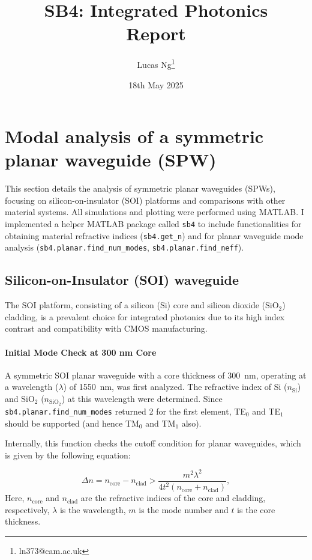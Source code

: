 \documentclass[10pt, a4paper]{article}
\title{\Large \bfseries SB4: Integrated Photonics\\[0.5em] \large Report}
\author{Lucas Ng\thanks{ln373@cam.ac.uk}}
\date{18th May 2025}
\begin{document}
\maketitle

\section{Modal analysis of a symmetric planar waveguide (SPW)}
This section details the analysis of symmetric planar waveguides (SPWs), focusing on silicon-on-insulator (SOI) platforms and comparisons with other material systems. All simulations and plotting were performed using MATLAB. I implemented a helper MATLAB package called \texttt{sb4} to include functionalities for obtaining material refractive indices (\texttt{sb4.get\_n}) and for planar waveguide mode analysis (\texttt{sb4.planar.find\_num\_modes}, \texttt{sb4.planar.find\_neff}).

\subsection{Silicon-on-Insulator (SOI) waveguide}
The SOI platform, consisting of a silicon (Si) core and silicon dioxide (SiO$_2$) cladding, is a prevalent choice for integrated photonics due to its high index contrast and compatibility with CMOS manufacturing.

\paragraph{Initial Mode Check at 300 nm Core}
A symmetric SOI planar waveguide with a core thickness of 300~nm, operating at a wavelength ($\lambda$) of 1550~nm, was first analyzed. The refractive index of Si ($n_{\text{Si}}$) and SiO$_2$ ($n_{\text{SiO}_2}$) at this wavelength were determined. Since \texttt{sb4.planar.find\_num\_modes} returned 2 for the first element, TE$_0$ and TE$_1$ should be supported (and hence TM$_0$ and TM$_1$ also).

Internally, this function checks the cutoff condition for planar waveguides, which is given by the following equation:

\begin{equation}
    \Delta n = n_{\text{core}} - n_{\text{clad}} > \frac{m^2\lambda^2}{4t^2(n_{\text{core}}+ n_{\text{clad}})},
\end{equation}
Here, $n_{\text{core}}$ and $n_{\text{clad}}$ are the refractive indices of the core and cladding, respectively, $\lambda$ is the wavelength, $m$ is the mode number and $t$ is the core thickness.
\end{document}
